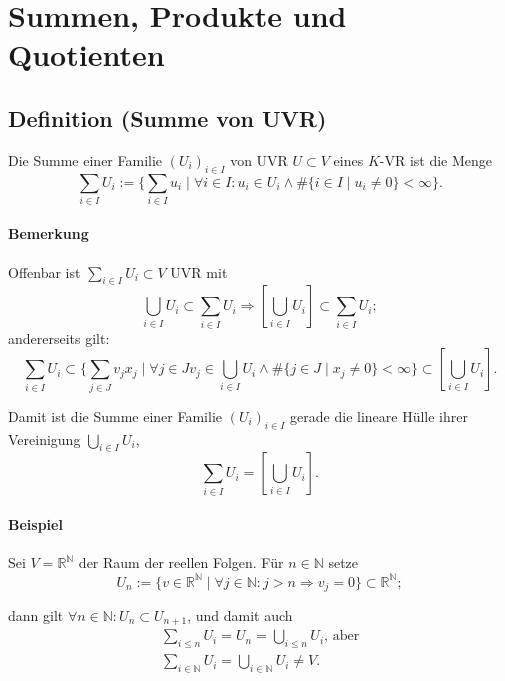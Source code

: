 \section{Summen, Produkte und Quotienten}
\subsection{Definition (Summe von UVR)}
	\begin{Definition}
		Die Summe einer Familie $ (U_i)_{i\in I} $ von UVR $ U\subset V $ eines $ K $-VR ist die Menge
		\begin{equation*}
		\sum_{i\in I} U_i := \{\sum_{i \in I}u_i\mid \forall i\in I: u_i\in U_i \land \# \{i\in I\mid u_i \neq 0\}<\infty\}.
		\end{equation*}
	\end{Definition}
		
\paragraph{Bemerkung}
	Offenbar ist $ \sum_{i\in I} U_i\subset V $ UVR mit
	\[  \bigcup_{i\in I}U_i \subset \sum_{i\in I} U_i \Rightarrow [\bigcup_{i\in I}U_i]\subset \sum_{i\in I} U_i; \]
	andererseits gilt:
	\[ \sum_{i\in I}U_i \subset \{\sum_{j\in J}v_jx_j\mid \forall j\in Jv_j\in \bigcup_{i\in I}U_i \land \#\{j\in J\mid x_j\neq 0\}<\infty\}\subset [\bigcup_{i\in I}U_i]. \]
	
	Damit ist die Summe einer Familie $ (U_i)_{i\in I} $ gerade die lineare Hülle ihrer Vereinigung $ \bigcup_{i\in I}U_i $,
	\[ \sum_{i\in I}U_i= [\bigcup_{i\in I}U_i]. \]
		
\paragraph{Beispiel}
	Sei $ V=\mathbb{R}^\mathbb{N} $ der Raum der reellen Folgen. Für $ n\in \mathbb{N} $ setze
		\begin{equation*}
		U_n := \{v\in \mathbb{R}^\mathbb{N}\mid \forall j\in \mathbb{N}: j>n\Rightarrow v_j = 0 \} \subset \mathbb{R}^\mathbb{N};
		\end{equation*}
		
	dann gilt $ \forall n\in \mathbb{N}: U_n\subset U_{n+1} $, und damit auch
		\begin{gather*}
		\sum_{i\leq n} U_i = U_n = \bigcup_{i\leq n}U_i \text{, aber}\\
		\sum_{i\in \mathbb{N}}U_i = \bigcup_{i\in \mathbb{N}}U_i \neq V.
		\end{gather*}
		
